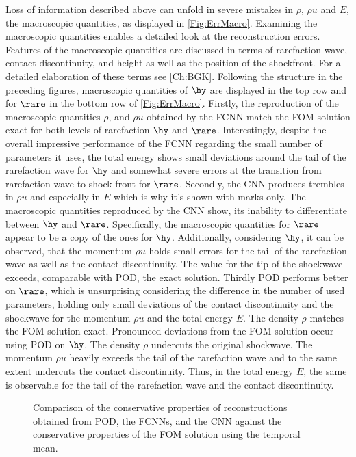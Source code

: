 Loss of information described above can unfold in severe mistakes in \(\rho\), \(\rho u\) and \(E\), the macroscopic quantities, as displayed in \cref{Fig:ErrMacro}. Examining the macroscopic quantities enables a detailed look at the reconstruction errors. Features of the macroscopic quantities are discussed in terms of rarefaction wave, contact discontinuity, and height as well as the position of the shockfront. For a detailed elaboration of these terms see \cref{Ch:BGK}. Following the structure in the preceding figures, macroscopic quantities of \(\hy\) are displayed in the top row and for \(\rare\) in the bottom row of \cref{Fig:ErrMacro}. Firstly, the reproduction of the macroscopic quantities \(\rho\), and \(\rho u\)  obtained by the FCNN match the FOM solution exact for both levels of rarefaction \(\hy\) and \(\rare\). Interestingly, despite the overall impressive performance of the FCNN regarding the small number of parameters it uses, the total energy shows small deviations around the tail of the rarefaction wave for \(\hy\) and somewhat severe errors at the transition from rarefaction wave to shock front for \(\rare\). Secondly, the CNN produces trembles in \(\rho u\) and especially in \(E\) which is why it's shown with marks only. The macroscopic quantities reproduced by the CNN show, its inability to differentiate between \(\hy\) and \(\rare\). Specifically, the macroscopic quantities for \(\rare\) appear to be a copy of the ones for \(\hy\). Additionally, considering \(\hy\), it can be observed, that the momentum \(\rho u\) holds small errors for the tail of the rarefaction wave as well as the contact discontinuity. The value for the tip of the shockwave exceeds, comparable with POD, the exact solution. Thirdly POD performs better on \(\rare\), which is unsurprising considering the difference in the number of used parameters, holding only small deviations of the contact discontinuity and the shockwave for the momentum \(\rho u\) and the total energy \(E\). The density \(\rho\) matches the FOM solution exact. Pronounced deviations from the FOM solution occur using POD on \(\hy\). The density \(\rho\) undercuts the original shockwave. The momentum \(\rho u\) heavily exceeds the tail of the rarefaction wave and to the same extent undercuts the contact discontinuity. Thus, in the total energy \(E\), the same is observable for the tail of the rarefaction wave and the contact discontinuity.
\begin{figure}[H]
	
	\caption{Comparison of the conservative properties of reconstructions obtained from POD, the FCNNs, and the CNN against the conservative properties of the FOM solution using the temporal mean.}
	\label{Fig:Conservation}
\end{figure}
